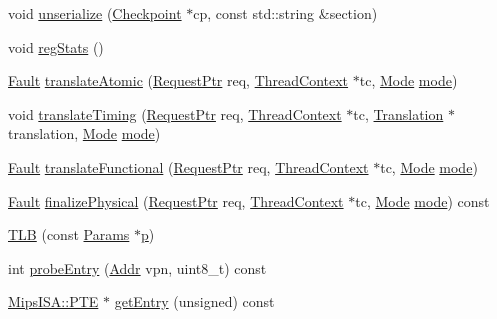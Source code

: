\begin{DoxyCompactItemize}
\item 
void \hyperlink{classMipsISA_1_1TLB_af22e5d6d660b97db37003ac61ac4ee49}{unserialize} (\hyperlink{classCheckpoint}{Checkpoint} $\ast$cp, const std::string \&section)
\item 
void \hyperlink{classMipsISA_1_1TLB_a4dc637449366fcdfc4e764cdf12d9b11}{regStats} ()
\item 
\hyperlink{classRefCountingPtr}{Fault} \hyperlink{classMipsISA_1_1TLB_ad54e01e3c0a1613098a76b7f92e5be93}{translateAtomic} (\hyperlink{classRequest}{RequestPtr} req, \hyperlink{classThreadContext}{ThreadContext} $\ast$tc, \hyperlink{classBaseTLB_a46c8a310cf4c094f8c80e1cb8dc1f911}{Mode} \hyperlink{namespaceMipsISA_ae317cde5969f1a58116b73ae0d8adec0}{mode})
\item 
void \hyperlink{classMipsISA_1_1TLB_ae52f7e465748883695d2b4f432a13652}{translateTiming} (\hyperlink{classRequest}{RequestPtr} req, \hyperlink{classThreadContext}{ThreadContext} $\ast$tc, \hyperlink{classBaseTLB_1_1Translation}{Translation} $\ast$translation, \hyperlink{classBaseTLB_a46c8a310cf4c094f8c80e1cb8dc1f911}{Mode} \hyperlink{namespaceMipsISA_ae317cde5969f1a58116b73ae0d8adec0}{mode})
\item 
\hyperlink{classRefCountingPtr}{Fault} \hyperlink{classMipsISA_1_1TLB_a26658814c6c9034665aae19cf25545bb}{translateFunctional} (\hyperlink{classRequest}{RequestPtr} req, \hyperlink{classThreadContext}{ThreadContext} $\ast$tc, \hyperlink{classBaseTLB_a46c8a310cf4c094f8c80e1cb8dc1f911}{Mode} \hyperlink{namespaceMipsISA_ae317cde5969f1a58116b73ae0d8adec0}{mode})
\item 
\hyperlink{classRefCountingPtr}{Fault} \hyperlink{classMipsISA_1_1TLB_ae199d95c42e036851a8a0543c6d6d2e3}{finalizePhysical} (\hyperlink{classRequest}{RequestPtr} req, \hyperlink{classThreadContext}{ThreadContext} $\ast$tc, \hyperlink{classBaseTLB_a46c8a310cf4c094f8c80e1cb8dc1f911}{Mode} \hyperlink{namespaceMipsISA_ae317cde5969f1a58116b73ae0d8adec0}{mode}) const 
\item 
\hyperlink{classMipsISA_1_1TLB_acb886bd3c59f00c21be9ceaaf25dab97}{TLB} (const \hyperlink{classMipsISA_1_1TLB_a8fcac7e147ea0cf7183de360adcb6efe}{Params} $\ast$\hyperlink{namespaceMipsISA_a37d3f683959086eac7bcf24a002a9fb8}{p})
\item 
int \hyperlink{classMipsISA_1_1TLB_a4dd1511c095e58173f0f7b78eeded1fe}{probeEntry} (\hyperlink{classm5_1_1params_1_1Addr}{Addr} vpn, uint8\_\-t) const 
\item 
\hyperlink{structMipsISA_1_1PTE}{MipsISA::PTE} $\ast$ \hyperlink{classMipsISA_1_1TLB_a2e0dd0d3ac6f571bfabd82a121e065af}{getEntry} (unsigned) const 

\end{DoxyCompactItemize}
